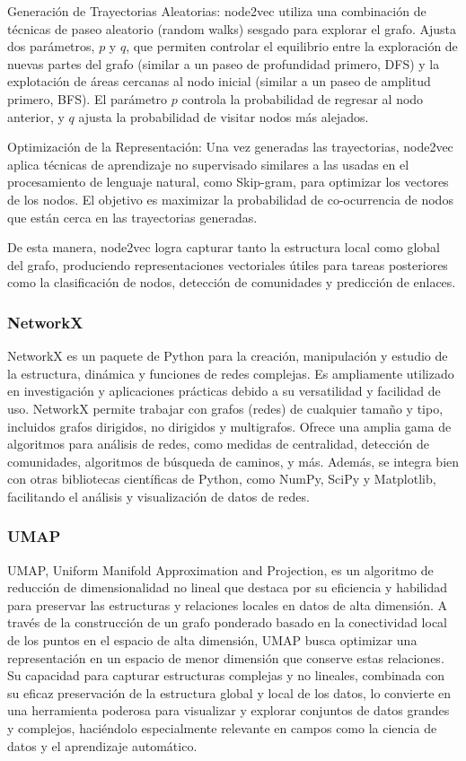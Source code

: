 \documentclass{article}
\begin{document}
Generación de Trayectorias Aleatorias: node2vec utiliza una combinación de técnicas de paseo aleatorio (random walks) sesgado para explorar el grafo. Ajusta dos parámetros, 
$p$ y $q$, que permiten controlar el equilibrio entre la exploración de nuevas partes del grafo (similar a un paseo de profundidad primero, DFS) y la explotación de áreas cercanas al nodo inicial (similar a un paseo de amplitud primero, BFS). El parámetro $p$ controla la probabilidad de regresar al nodo anterior, y $q$ ajusta la probabilidad de visitar nodos más alejados.

Optimización de la Representación: Una vez generadas las trayectorias, node2vec aplica técnicas de aprendizaje no supervisado similares a las usadas en el procesamiento de lenguaje natural, como Skip-gram, para optimizar los vectores de los nodos. El objetivo es maximizar la probabilidad de co-ocurrencia de nodos que están cerca en las trayectorias generadas.

De esta manera, node2vec logra capturar tanto la estructura local como global del grafo, produciendo representaciones vectoriales útiles para tareas posteriores como la clasificación de nodos, detección de comunidades y predicción de enlaces.

\subsubsection{NetworkX}
NetworkX es un paquete de Python para la creación, manipulación y estudio de la estructura, dinámica y funciones de redes complejas. Es ampliamente utilizado en investigación y aplicaciones prácticas debido a su versatilidad y facilidad de uso. NetworkX permite trabajar con grafos (redes) de cualquier tamaño y tipo, incluidos grafos dirigidos, no dirigidos y multigrafos. Ofrece una amplia gama de algoritmos para análisis de redes, como medidas de centralidad, detección de comunidades, algoritmos de búsqueda de caminos, y más. Además, se integra bien con otras bibliotecas científicas de Python, como NumPy, SciPy y Matplotlib, facilitando el análisis y visualización de datos de redes.

\subsubsection{UMAP}
UMAP, Uniform Manifold Approximation and Projection, es un algoritmo de reducción de dimensionalidad no lineal que destaca por su eficiencia y habilidad para preservar las estructuras y relaciones locales en datos de alta dimensión. A través de la construcción de un grafo ponderado basado en la conectividad local de los puntos en el espacio de alta dimensión, UMAP busca optimizar una representación en un espacio de menor dimensión que conserve estas relaciones. Su capacidad para capturar estructuras complejas y no lineales, combinada con su eficaz preservación de la estructura global y local de los datos, lo convierte en una herramienta poderosa para visualizar y explorar conjuntos de datos grandes y complejos, haciéndolo especialmente relevante en campos como la ciencia de datos y el aprendizaje automático.
\end{document}
